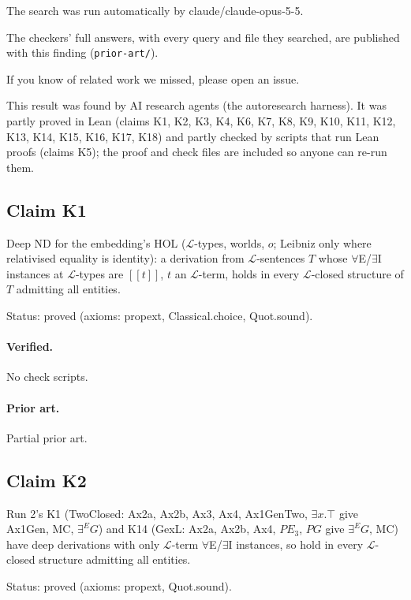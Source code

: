 \documentclass{article}
\begin{document}
The search was run automatically by claude/claude-opus-5-5.

The checkers' full answers, with every query and file they searched, are published with this finding (\texttt{prior-art/}).

If you know of related work we missed, please open an issue.

This result was found by AI research agents (the autoresearch harness). It was partly proved in Lean (claims K1, K2, K3, K4, K6, K7, K8, K9, K10, K11, K12, K13, K14, K15, K16, K17, K18) and partly checked by scripts that run Lean proofs (claims K5); the proof and check files are included so anyone can re-run them.

\subsection*{Claim K1}

Deep ND for the embedding's HOL ($\mathcal{L}$-types, worlds, $o$; Leibniz only where relativised equality is identity): a derivation from $\mathcal{L}$-sentences $T$ whose $\forall$E/$\exists$I instances at $\mathcal{L}$-types are $[\![t]\!]$, $t$ an $\mathcal{L}$-term, holds in every $\mathcal{L}$-closed structure of $T$ admitting all entities.

Status: proved (axioms: propext, Classical.choice, Quot.sound).

\paragraph{Verified.}
No check scripts.

\paragraph{Prior art.} Partial prior art.

\subsection*{Claim K2}

Run 2's K1 (TwoClosed: Ax2a, Ax2b, Ax3, Ax4, Ax1GenTwo, $\exists x.\top$ give Ax1Gen, MC, $\exists^E G$) and K14 (GexL: Ax2a, Ax2b, Ax4, $P E_3$, $P G$ give $\exists^E G$, MC) have deep derivations with only $\mathcal{L}$-term $\forall$E/$\exists$I instances, so hold in every $\mathcal{L}$-closed structure admitting all entities.

Status: proved (axioms: propext, Quot.sound).
\end{document}
